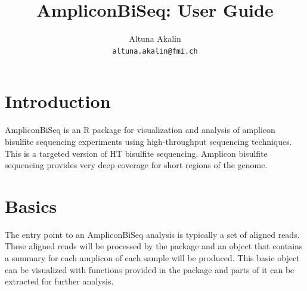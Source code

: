 \documentclass{article}\usepackage[]{graphicx}\usepackage[]{color}
\title{ AmpliconBiSeq: User Guide}
\begin{document}
\author{Altuna Akalin\\ \texttt{altuna.akalin@fmi.ch}}

\maketitle

\tableofcontents

\section{Introduction}
AmpliconBiSeq is an R package for visualization and analysis of amplicon bisulfite
sequencing experiments using high-throughput sequencing techniques. This is a targeted
version of HT bisulfite sequencing. Amplicon bisulfite sequencing provides very deep 
coverage for short regions of the genome.
 

\section{Basics}
The entry point to an AmpliconBiSeq analysis is typically a set of aligned reads. These aligned 
reads will be processed by the package and an object that contains a summary for each amplicon of each sample
will be produced. This basic object can be visualized with functions provided in the package and parts of it 
can be extracted for further analysis.
\end{document}
